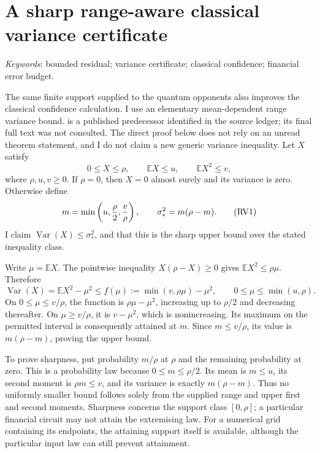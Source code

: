 
\section{A sharp range-aware classical variance certificate}
\label{sec:range-classical-variance}

\emph{Keywords}: bounded residual; variance certificate; classical confidence; financial error budget.

The same finite support supplied to the quantum opponents also improves the classical confidence calculation. I use an elementary mean-dependent range variance bound. \citet{bhatiadavis} is a published predecessor identified in the source ledger; its final full text was not consulted. The direct proof below does not rely on an unread theorem statement, and I do not claim a new generic variance inequality. Let \(X\) satisfy
\[
 0\leq X\leq\rho,\qquad \mathbb EX\leq u,\qquad
 \mathbb EX^2\leq v,
\]
where \(\rho,u,v\geq0\). If \(\rho=0\), then \(X=0\) almost surely and its variance is zero. Otherwise define
\[
 m=\min\left(u,{\rho\over2},{v\over\rho}\right),\qquad
 \sigma_*^2=m(\rho-m).
 \tag{RV1}\label{eq:sharp-range-variance}
\]
I claim \(\operatorname{Var}(X)\leq\sigma_*^2\), and that this is the sharp upper bound over the stated inequality class.

Write \(\mu=\mathbb EX\). The pointwise inequality \(X(\rho-X)\geq0\) gives \(\mathbb EX^2\leq\rho\mu\). Therefore
\[
 \operatorname{Var}(X)
 =\mathbb EX^2-\mu^2
 \leq f(\mu):=\min(v,\rho\mu)-\mu^2,
 \qquad0\leq\mu\leq\min(u,\rho).
\]
On \(0\leq\mu\leq v/\rho\), the function is \(\rho\mu-\mu^2\), increasing up to \(\rho/2\) and decreasing thereafter. On \(\mu\geq v/\rho\), it is \(v-\mu^2\), which is nonincreasing. Its maximum on the permitted interval is consequently attained at \(m\). Since \(m\leq v/\rho\), its value is \(m(\rho-m)\), proving the upper bound.

To prove sharpness, put probability \(m/\rho\) at \(\rho\) and the remaining probability at zero. This is a probability law because \(0\leq m\leq\rho/2\). Its mean is \(m\leq u\), its second moment is \(\rho m\leq v\), and its variance is exactly \(m(\rho-m)\). Thus no uniformly smaller bound follows solely from the supplied range and upper first and second moments. Sharpness concerns the support class \([0,\rho]\); a particular financial circuit may not attain the extremising law. For a numerical grid containing its endpoints, the attaining support itself is available, although the particular input law can still prevent attainment.

